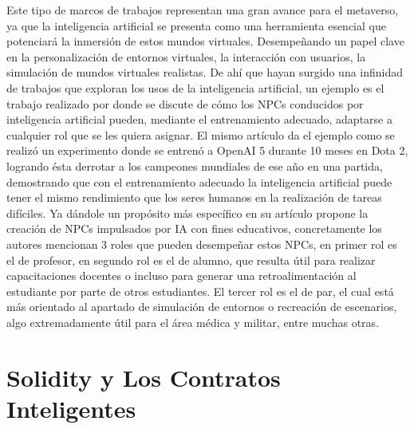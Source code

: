 \documentclass[a4paper,10pt]{article}
\begin{document}
	Este tipo de marcos de trabajos representan una gran avance para el metaverso, ya que la inteligencia artificial se presenta como una herramienta esencial que potenciará la inmersión de estos mundos virtuales. Desempeñando un papel clave en la personalización de entornos virtuales, la interacción con usuarios, la simulación de mundos virtuales realistas. De ahí que hayan surgido una infinidad de trabajos que exploran los usos de la inteligencia artificial, un ejemplo es el trabajo realizado por \textcite{yang2022fusing} donde se discute de cómo los NPCs conducidos por inteligencia artificial pueden, mediante el entrenamiento adecuado, adaptarse a cualquier rol que se les quiera asignar. El mismo artículo da el ejemplo como se realizó un experimento donde se entrenó a OpenAI 5 durante 10 meses en Dota 2, logrando ésta derrotar a los campeones mundiales de ese año en una partida, demostrando que con el entrenamiento adecuado la inteligencia artificial puede tener el mismo rendimiento que los seres humanos en la realización de tareas difíciles. Ya dándole un propósito más específico \textcite{hwang2022definition} en su artículo propone la creación de NPCs impulsados por IA con fines educativos, concretamente los autores mencionan 3 roles que pueden desempeñar estos NPCs, en primer rol es el de profesor, en segundo rol es el de alumno, que resulta útil para realizar capacitaciones docentes o incluso para generar una retroalimentación al estudiante por parte de otros estudiantes. El tercer rol es el de par, el cual está más orientado al apartado de simulación de entornos o recreación de escenarios, algo extremadamente útil para el área médica y militar, entre muchas otras.
	
	\section{Solidity y Los Contratos Inteligentes}
	
	
	\nocite{*}
	\printbibliography[heading=bibintoc]
\end{document}
